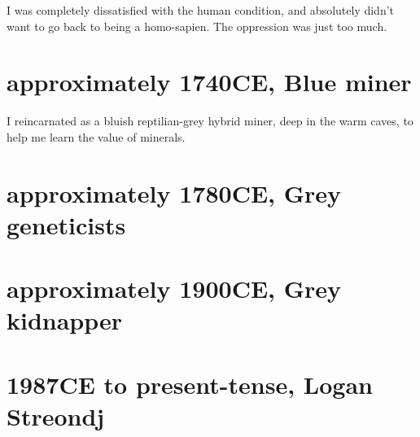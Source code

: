 I was completely dissatisfied with the human condition, and absolutely didn't
want to go back to being a homo-sapien. The oppression was just too much.

\chapter{approximately 1740CE, Blue miner}
I reincarnated as a bluish reptilian-grey hybrid miner, deep in the warm caves, to help me learn the value of minerals.
\chapter{approximately 1780CE, Grey geneticists}
\chapter{approximately 1900CE, Grey kidnapper}
\chapter{1987CE to present-tense, Logan Streondj}
